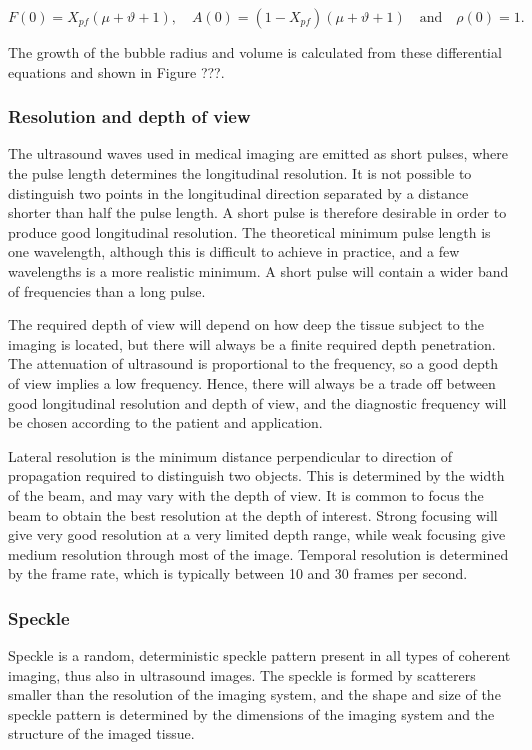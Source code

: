 \begin{equation}
F(0) = X_{pf}(\mu +\vartheta +1),\quad A(0)=(1-X_{pf})(\mu+\vartheta+1)\quad
\mathrm{and}\quad \rho(0)=1.
\end{equation}

The growth of the bubble radius and volume is calculated from these differential equations and shown in Figure ???.

   
\subsubsection{Resolution and depth of view}
The ultrasound waves used in medical imaging are emitted as short pulses, where the pulse length determines the longitudinal resolution. It is not possible to distinguish two points in the longitudinal direction separated by a distance shorter than half the pulse length. A short pulse is therefore desirable in order to produce good longitudinal resolution. The theoretical minimum pulse length is one wavelength, although this is difficult to achieve in practice, and a few wavelengths is a more realistic minimum. A short pulse will contain a wider band of frequencies than a long pulse. 

The required depth of view will depend on how deep the tissue subject to the imaging is located, but there will always be a finite required depth penetration. The attenuation of ultrasound is proportional to the frequency, so a good depth of view implies a low frequency. Hence, there will always be a trade off between good longitudinal resolution and depth of view, and the diagnostic frequency will be chosen according to the patient and application. 

Lateral resolution is the minimum distance perpendicular to direction of propagation required to distinguish two objects. This is determined by the width of the beam, and may vary with the depth of view. It is common to focus the beam to obtain the best resolution at the depth of interest. Strong focusing will give very good resolution at a very limited depth range, while weak focusing give medium resolution through most of the image. Temporal resolution is determined by the frame rate, which is typically between 10 and 30 frames per second. 

\subsubsection{Speckle}
Speckle is a random, deterministic speckle pattern present in all types of coherent imaging, thus also in ultrasound images. The speckle is formed by scatterers smaller than the resolution of the imaging system, and the shape and size of the speckle pattern is determined by the dimensions of the imaging system and the structure of the imaged tissue.

